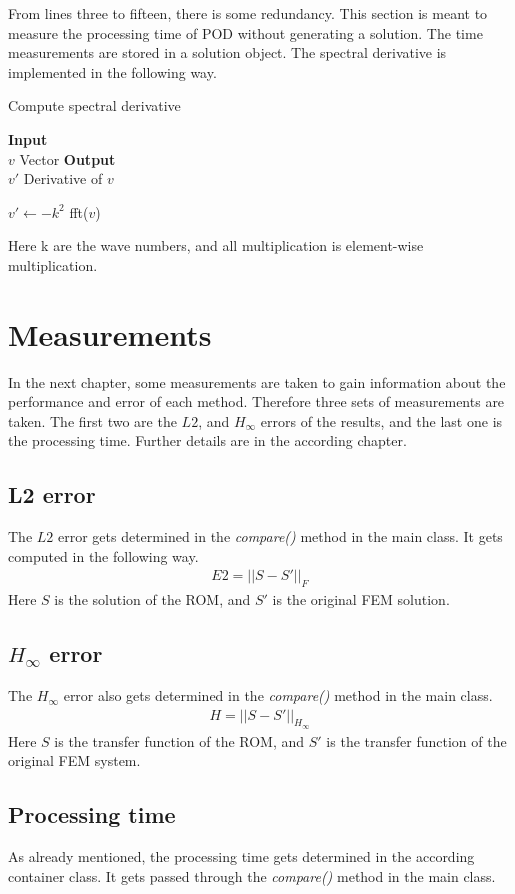From lines three to fifteen, there is some redundancy.
This section is meant to measure the processing time of POD without generating a solution.
The time measurements are stored in a solution object.
The spectral derivative is implemented in the following way.
\begin{algorithm}[H]
\caption{Compute spectral derivative}
\textbf{Input} \\
\hspace*{\algorithmicindent} $v$ Vector
\textbf{Output} \\
\hspace*{\algorithmicindent} $v'$ Derivative of $v$
\begin{algorithmic}[1]
\State $v' \gets -k^{2}$ fft($v$)
\EndProcedure
\end{algorithmic}
\end{algorithm}
Here k are the wave numbers, and all multiplication is element-wise multiplication.

\section{Measurements}
In the next chapter, some measurements are taken to gain information about the performance and error of each method.
Therefore three sets of measurements are taken.
The first two are the \(L2\), and \(H_{\infty}\) errors of the results, and the last one is the processing time.
Further details are in the according chapter.
\subsection{L2 error}
The \(L2\) error gets determined in the \textit{compare()} method in the main class.
It gets computed in the following way.
\begin{gather}
E2 = ||S - S'||_{F}
\end{gather}
Here \(S\) is the solution of the ROM, and \(S'\) is the original FEM solution.

\subsection{$H_{\infty}$ error}
The \(H_{\infty}\) error also gets determined in the \textit{compare()} method in the main class.
\begin{gather}
H = ||S - S'||_{H_{\infty}}
\end{gather}
Here \(S\) is the transfer function of the ROM, and \(S'\) is the transfer function of the original FEM system.
\subsection{Processing time}
As already mentioned, the processing time gets determined in the according container class.
It gets passed through the \textit{compare()} method in the main class.







